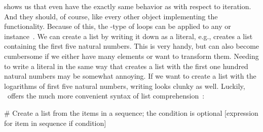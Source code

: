  shows us that even  have the exactly same behavior as  with respect to iteration.
And they should, of course, like every other object implementing the~ functionality.
Because of this, the -type of loops can be applied to any  or  instance~.%
%
\endhsection%
%
%
\label{sec:listComprehension}%
%
We can create a list by writing it down as a literal, e.g., \pythonil{[1, 2, 3, 4, 5]} creates a list containing the first five natural numbers.
This is very handy, but can also become cumbersome if we either have many elements or want to transform them.
Needing to write a literal in the same way that creates a list with the first one hundred natural numbers may be somewhat annoying.
If we want to create a list with the logarithms of first five natural numbers, writing  looks clunky as well.
Luckily, \python\ offers the much more convenient syntax of list comprehension~\cite{PEP202}:%
%
\begin{pythonSyntax}
# Create a list from the items in a sequence; the condition is optional
[expression for item in sequence if condition]
\end{pythonSyntax}
%
%
%
%
%
%
%
